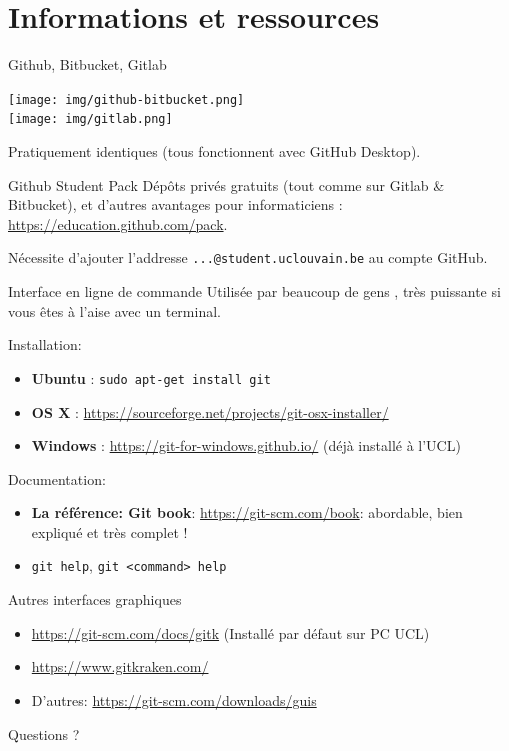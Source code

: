 \documentclass{beamer}
\begin{document}
\section{Informations et ressources}

\begin{frame}{Github, Bitbucket, Gitlab}
    \begin{center}
        \texttt{[image: img/github-bitbucket.png]} \\
        \texttt{[image: img/gitlab.png]}
    \end{center}
    Pratiquement identiques (tous fonctionnent avec GitHub Desktop).
\end{frame}

\begin{frame}{Github Student Pack}
    Dépôts privés gratuits (tout comme sur Gitlab \& Bitbucket), et d'autres avantages pour informaticiens : \url{https://education.github.com/pack}.

    Nécessite d'ajouter l'addresse \texttt{...@student.uclouvain.be} au compte
    GitHub.
\end{frame}

\begin{frame}{Interface en ligne de commande}
    Utilisée par beaucoup de gens , très puissante si vous êtes à l'aise avec
    un terminal.

    Installation:
    \begin{itemize}
        \item \textbf{Ubuntu} : \texttt{sudo apt-get install git}
        \item \textbf{OS X} : \url{https://sourceforge.net/projects/git-osx-installer/}
        \item \textbf{Windows} : \url{https://git-for-windows.github.io/} (déjà
            installé à l'UCL)
    \end{itemize}

    Documentation:
    \begin{itemize}
        \item \textbf{La référence: Git book}: \url{https://git-scm.com/book}:
            abordable, bien expliqué et très complet !
        \item \texttt{git help}, \texttt{git <command> help}
    \end{itemize}
\end{frame}

\begin{frame}{Autres interfaces graphiques}
    \begin{itemize}
        \item \url{https://git-scm.com/docs/gitk} (Installé par défaut sur PC UCL)
        \item \url{https://www.gitkraken.com/}
        \item D'autres: \url{https://git-scm.com/downloads/guis}
    \end{itemize}
\end{frame}

\begin{frame}[standout]
    Questions ?
\end{frame}
\end{document}
